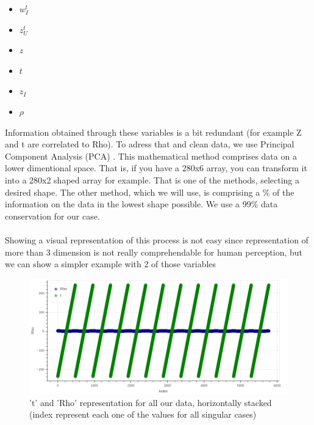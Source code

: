 \documentclass[openany]{article}
\begin{document}
\begin{itemize}
    \item \(w_I^t\)
    \item \(z_U^t\)
    \item \(z\)
    \item \(t\)
    \item \(z_I\)
    \item \( \rho \)
\end{itemize}

Information obtained through these variables is a bit redundant (for example Z and t are correlated to Rho). To adress that and clean data, we use Principal Component Analysis (PCA) \cite{tipping1998mixtures}. This mathematical method comprises data on a lower dimentional space. That is, if you have a 280x6 array, you can transform it into a 280x2 shaped array for example. That is one of the methods, selecting a desired shape. The other method, which we will use, is comprising a \% of the information on the data in the lowest shape possible. We use a 99\% data conservation for our case.\\
\\
Showing a visual representation of this process is not easy since representation of more than 3 dimension is not really comprehendable for human perception, but we can show a simpler example with 2 of those variables 

\begin{figure}[!h]
    \centering
    \includegraphics[width=\textwidth]{PrePCA.png}
    \caption{'t' and 'Rho' representation for all our data, horizontally stacked (index represent each one of the values for all singular cases)}
    \label{fig:my_label}
\end{figure}
\end{document}
